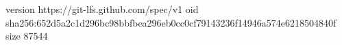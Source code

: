 version https://git-lfs.github.com/spec/v1
oid sha256:652d5a2c1d296bc98bbfbea296eb0cc0cf79143236f14946a574e6218504840f
size 87544
